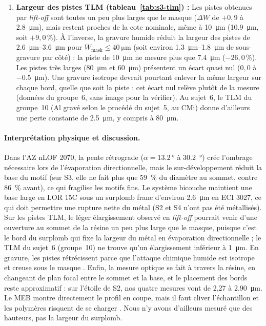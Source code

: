 \begin{enumerate}
  \item \textbf{Largeur des pistes TLM (tableau~\ref{tab:s3-tlm}) :} Les pistes obtenues par \emph{lift-off} sont toutes un peu plus larges que le masque ($\Delta W$ de $+0{,}9$ à \qty{+2,8}{\micro\metre}), mais restent proches de la cote nominale, même à \qty{10}{\micro\metre} (\qty{10,9}{\micro\metre}, soit $+9{,}0$\,\%). À l'inverse, la gravure humide réduit la largeur des pistes de \qtyrange{2,6}{3,6}{\micro\metre} pour $W_{\text{mask}} \le \qty{40}{\micro\metre}$ (soit environ \qtyrange{1,3}{1,8}{\micro\metre} de sous-gravure par côté) : la piste de \qty{10}{\micro\metre} ne mesure plus que \qty{7,4}{\micro\metre} ($-26{,}0$\,\%). Les pistes très larges (\qty{80}{\micro\metre} et \qty{60}{\micro\metre}) présentent un écart quasi nul ($0{,}0$ à \qty{-0,5}{\micro\metre}). Une gravure isotrope devrait pourtant enlever la même largeur sur chaque bord, quelle que soit la piste : cet écart nul relève plutôt de la mesure (données du groupe~6, sans image pour la vérifier). Au sujet~6, le TLM du groupe~10 (Al gravé selon le procédé du sujet~5, au CMi) donne d'ailleurs une perte constante de \qty{2,5}{\micro\metre}, y compris à \qty{80}{\micro\metre}.
\end{enumerate}

\paragraph{Interprétation physique et discussion.}
Dans l'AZ nLOF 2070, la pente rétrograde ($\alpha = \qty{13,2}{\degree}$ à \qty{30,2}{\degree}) crée l'ombrage nécessaire lors de l'évaporation directionnelle, mais le sur-développement réduit la base du motif (sur S3, elle ne fait plus que \qty{59}{\percent} du diamètre au sommet, contre \qty{86}{\percent} avant), ce qui fragilise les motifs fins. Le système bicouche maintient une base large en LOR 15C sous un surplomb franc d'environ \qty{2,6}{\micro\metre} en ECI 3027, ce qui doit permettre une rupture nette du métal (S2 et S4 n'ont pas été métallisés). Sur les pistes TLM, le léger élargissement observé en \emph{lift-off} pourrait venir d'une ouverture au sommet de la résine un peu plus large que le masque, puisque c'est le bord du surplomb qui fixe la largeur du métal en évaporation directionnelle ; le TLM du sujet~6 (groupe~10) ne trouve qu'un élargissement inférieur à \qty{1}{\micro\metre}. En gravure, les pistes rétrécissent parce que l'attaque chimique humide est isotrope et creuse sous le masque \cite{intro,alumicro}. Enfin, la mesure optique se fait à travers la résine, en changeant de plan focal entre le sommet et la base, et le placement des bords reste approximatif : sur l'étoile de S2, nos quatre mesures vont de 2,27 à \qty{2,90}{\micro\metre}. Le MEB montre directement le profil en coupe, mais il faut cliver l'échantillon et les polymères risquent de se charger \cite{tm1000}. Nous n'y avons d'ailleurs mesuré que des hauteurs, pas la largeur du surplomb.

